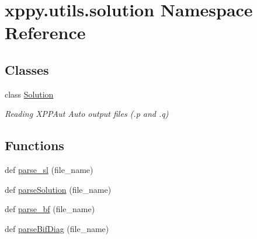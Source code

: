 \hypertarget{namespacexppy_1_1utils_1_1solution}{}\section{xppy.\+utils.\+solution Namespace Reference}
\label{namespacexppy_1_1utils_1_1solution}
\subsection*{Classes}
\begin{DoxyCompactItemize}
\item 
class \mbox{\hyperlink{classxppy_1_1utils_1_1solution_1_1_solution}{Solution}}
\begin{DoxyCompactList}\small\item\em Reading X\+P\+P\+Aut Auto output files (.p and .q) \end{DoxyCompactList}\end{DoxyCompactItemize}
\subsection*{Functions}
\begin{DoxyCompactItemize}
\item 
def \mbox{\hyperlink{namespacexppy_1_1utils_1_1solution_a1add3df0e71bb9a40388bd75e587ad54}{parse\+\_\+sl}} (file\+\_\+name)
\item 
def \mbox{\hyperlink{namespacexppy_1_1utils_1_1solution_ac3bd329d93694b3603ed350221b06fe6}{parse\+Solution}} (file\+\_\+name)
\item 
def \mbox{\hyperlink{namespacexppy_1_1utils_1_1solution_a4af681798b29c0eb1db40f735f1175ca}{parse\+\_\+bf}} (file\+\_\+name)
\item 
def \mbox{\hyperlink{namespacexppy_1_1utils_1_1solution_a37f0231143a38e1a11598985f2d68f91}{parse\+Bif\+Diag}} (file\+\_\+name)
\end{DoxyCompactItemize}



